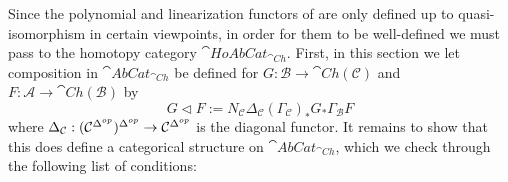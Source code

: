 Since the polynomial and linearization functors of \cite{JohnsonB.2004Dcwc} are only defined up to quasi-isomorphism in certain viewpoints, in order for them to be well-defined we must pass to the homotopy category $\cat{HoAbCat}_{\cat{Ch}}$. First, in this section we let composition in $\cat{AbCat}_{\cat{Ch}}$ be defined for $G:\mathcal{B}\rightarrow \cat{Ch}(\mathcal{C})$ and $F:\mathcal{A}\rightarrow \cat{Ch}(\mathcal{B})$ by
\begin{equation*}
    G\lhd F := N_\mathcal{C}\Delta_\mathcal{C}(\Gamma_\mathcal{C})_* G_*\Gamma_\mathcal{B} F
\end{equation*}
where $\Delta_\mathcal{C}:(\mathcal{C}^{\Delta^{op}})^{\Delta^{op}}\rightarrow \mathcal{C}^{\Delta^{op}}$ is the diagonal functor. It remains to show that this does define a categorical structure on $\cat{AbCat}_{\cat{Ch}}$, which we check through the following list of conditions:
